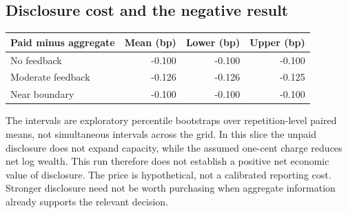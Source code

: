 \subsection*{Disclosure cost and the negative result}
\begin{center}\small
\begin{tabular}{lrrr}
\toprule
Paid minus aggregate & Mean (bp) & Lower (bp) & Upper (bp)\\
\midrule
No feedback & -0.100 & -0.100 & -0.100\\
Moderate feedback & -0.126 & -0.126 & -0.125\\
Near boundary & -0.100 & -0.100 & -0.100\\
\bottomrule
\end{tabular}
\end{center}
The intervals are exploratory percentile bootstraps over repetition-level
paired means, not simultaneous intervals across the grid. In this slice the
unpaid disclosure does not expand capacity, while the assumed one-cent charge
reduces net log wealth. This run therefore does not establish a positive net
economic value of disclosure. The price is hypothetical, not a calibrated
reporting cost. Stronger disclosure need not be worth purchasing when aggregate
information already supports the relevant decision.

